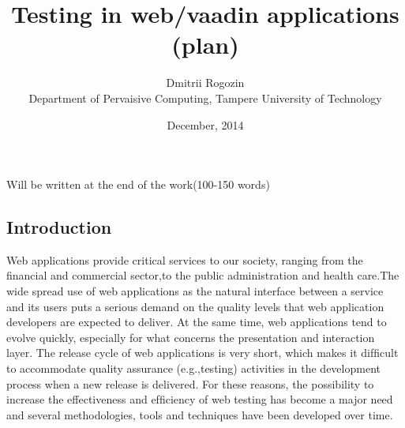 \documentclass{article}
\begin{document}
\lstset{
  language=Java, %
   basicstyle=\tiny                
}


\title{Testing in web/vaadin applications (plan)}
\date{December, 2014}
\author{Dmitrii Rogozin\\ Department of Pervaisive Computing, Tampere University
of Technology}
\maketitle
\abstract
Will be written at the end of the work(100-150 words)

\subsection{Introduction}

		Web applications provide critical services to our society,
	 ranging from the ﬁnancial and commercial sector,to the public
	 administration and health care.The wide spread use of web
	 applications as the natural interface between a service and its
	 users puts a serious demand on the quality levels that web
	 application developers are expected to deliver. At the same time,
	 web applications tend to evolve quickly, especially for what
	 concerns the presentation and interaction layer. The release
	 cycle of web applications is very short, which makes it difﬁcult
	 to accommodate quality assurance (e.g.,testing) activities in 
	 the development process when a new release is delivered. For
	 these reasons, the possibility to increase the effectiveness and
	 efﬁciency of web testing has become a major need and several 
	 methodologies, tools and techniques have been developed over time.
	 
\end{document}
